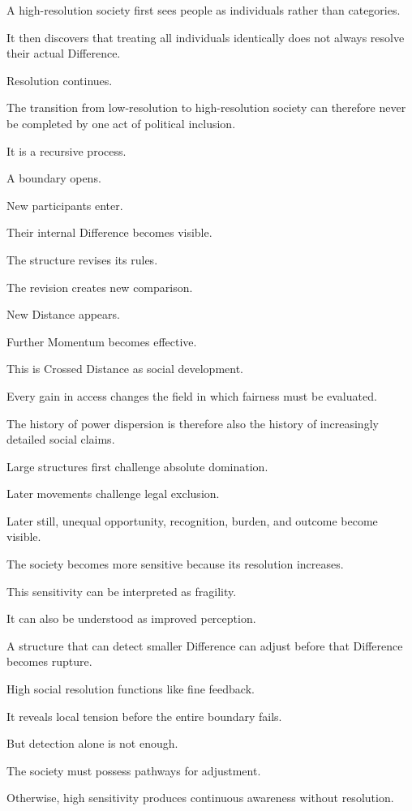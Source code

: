 A high-resolution society first sees people as individuals rather than categories.

It then discovers that treating all individuals identically does not always resolve their actual Difference.

Resolution continues.

The transition from low-resolution to high-resolution society can therefore never be completed by one act of political inclusion.

It is a recursive process.

A boundary opens.

New participants enter.

Their internal Difference becomes visible.

The structure revises its rules.

The revision creates new comparison.

New Distance appears.

Further Momentum becomes effective.

This is Crossed Distance as social development.

Every gain in access changes the field in which fairness must be evaluated.

The history of power dispersion is therefore also the history of increasingly detailed social claims.

Large structures first challenge absolute domination.

Later movements challenge legal exclusion.

Later still, unequal opportunity, recognition, burden, and outcome become visible.

The society becomes more sensitive because its resolution increases.

This sensitivity can be interpreted as fragility.

It can also be understood as improved perception.

A structure that can detect smaller Difference can adjust before that Difference becomes rupture.

High social resolution functions like fine feedback.

It reveals local tension before the entire boundary fails.

But detection alone is not enough.

The society must possess pathways for adjustment.

Otherwise, high sensitivity produces continuous awareness without resolution.

